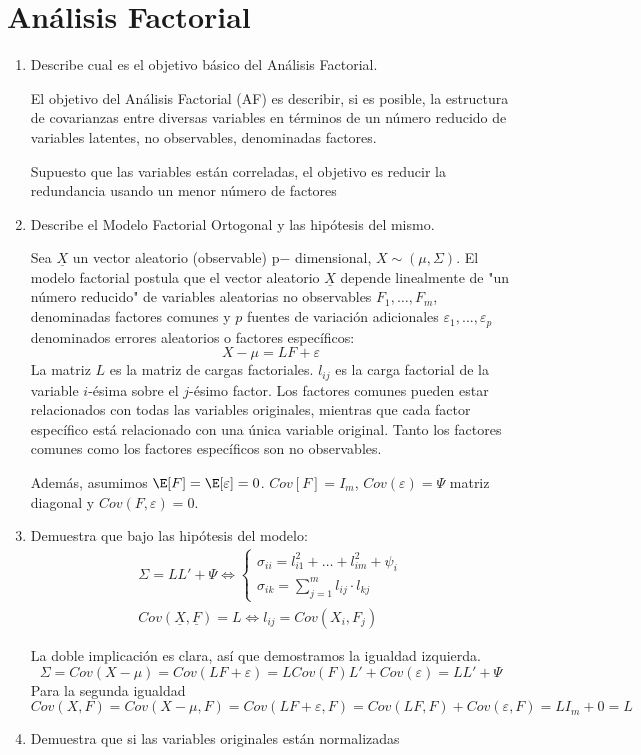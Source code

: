 \documentclass[twoside]{article}
\newcommand{\muestra}[1]{{\underline{#1}}}
\newcommand{\m}[1]{{\muestra{#1}}}
\begin{document}
\section{Análisis Factorial}
\begin{enumerate}
\item Describe cual es el objetivo básico del Análisis Factorial.

El objetivo del Análisis Factorial (AF) es describir, si es posible, la estructura de covarianzas entre diversas variables en términos de un número reducido de variables
latentes, no observables, denominadas factores.

Supuesto que las variables están correladas, el objetivo es reducir la redundancia usando un menor número de factores

\item Describe el Modelo Factorial Ortogonal y las hipótesis del mismo.

Sea $\muestra{X}$ un vector aleatorio (observable) p− dimensional, $X \sim (\mu,\Sigma)$. El modelo factorial postula que el vector aleatorio $\muestra{X}$ depende linealmente de "un número reducido" de variables aleatorias no observables $F_1,\dotsc,F_m$, denominadas factores comunes y $p$ fuentes de variación adicionales $\varepsilon_1, ..., ε_p$ denominados errores aleatorios o
factores específicos:
$$
X-\mu = LF+\varepsilon
$$
La matriz $L$ es la matriz de cargas factoriales. $l_{ij}$ es la carga factorial de la variable $i$-ésima sobre el $j$-ésimo factor. Los factores comunes pueden estar relacionados con todas las variables originales, mientras que cada factor específico está relacionado con una única variable original. Tanto los factores comunes como los factores específicos son no observables. 

Además, asumimos $\E[F]=\E[\varepsilon]=0$. $Cov[F]=I_m$, $Cov(\varepsilon)=\Psi$ matriz diagonal y $Cov(F,\varepsilon)=0$.
\item Demuestra que bajo las hipótesis del modelo:
\begin{gather}
\Sigma = L L' + \Psi \Leftrightarrow
\begin{cases}
\sigma_{ii} = l_{i1}^2 + \dots + l_{im}^2 + \psi_i\\
\sigma_{ik} = \sum_{j=1}^m l_{ij} \cdot l_{kj}
\end{cases}\\
Cov(\m{X}, \m{F}) = L \Leftrightarrow l_{ij} = Cov(X_i, F_j)
\end{gather}

La doble implicación es clara, así que demostramos la igualdad izquierda.
$$
\Sigma = Cov(X-\mu) = Cov(LF+\varepsilon) = LCov(F)L' + Cov(\varepsilon) = LL'+\Psi
$$
Para la segunda igualdad
$$
Cov(X,F) = Cov(X-\mu,F) = Cov(LF+\varepsilon,F) = Cov(LF,F)+Cov(\varepsilon,F) = LI_m + 0 = L
$$
\item Demuestra que si las variables originales están normalizadas


\end{enumerate}
\end{document}
